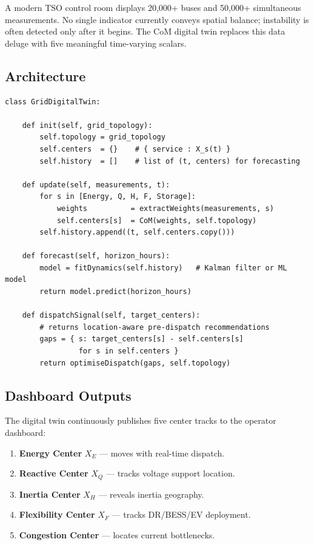\documentclass[12pt, a4paper]{article}
\begin{document}
A modern TSO control room displays 20,000+ buses and 50,000+ simultaneous
measurements. No single indicator currently conveys spatial balance; instability
is often detected only after it begins. The CoM digital twin replaces this data
deluge with five meaningful time-varying scalars.

\subsection{Architecture}

\begin{lstlisting}[caption={Grid Digital Twin: real-time estimator and forecaster},
                   label={lst:twin}]
class GridDigitalTwin:

    def init(self, grid_topology):
        self.topology = grid_topology
        self.centers  = {}    # { service : X_s(t) }
        self.history  = []    # list of (t, centers) for forecasting

    def update(self, measurements, t):
        for s in [Energy, Q, H, F, Storage]:
            weights          = extractWeights(measurements, s)
            self.centers[s]  = CoM(weights, self.topology)
        self.history.append((t, self.centers.copy()))

    def forecast(self, horizon_hours):
        model = fitDynamics(self.history)   # Kalman filter or ML model
        return model.predict(horizon_hours)

    def dispatchSignal(self, target_centers):
        # returns location-aware pre-dispatch recommendations
        gaps = { s: target_centers[s] - self.centers[s]
                 for s in self.centers }
        return optimiseDispatch(gaps, self.topology)
\end{lstlisting}

\subsection{Dashboard Outputs}

The digital twin continuously publishes five center tracks to the operator
dashboard:

\begin{enumerate}[leftmargin=2em]
  \item \textbf{Energy Center} $X_E$ --- moves with real-time dispatch.
  \item \textbf{Reactive Center} $X_Q$ --- tracks voltage support location.
  \item \textbf{Inertia Center} $X_H$ --- reveals inertia geography.
  \item \textbf{Flexibility Center} $X_F$ --- tracks DR/BESS/EV deployment.
  \item \textbf{Congestion Center} --- locates current bottlenecks.
\end{enumerate}
\end{document}
